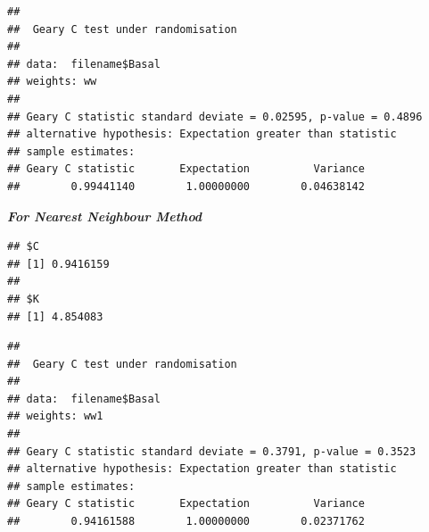 \documentclass[
]{book}
\newenvironment{Shaded}{\begin{snugshade}}{\end{snugshade}}
\newcommand{\AttributeTok}[1]{\textcolor[rgb]{0.77,0.63,0.00}{#1}}
\newcommand{\DecValTok}[1]{\textcolor[rgb]{0.00,0.00,0.81}{#1}}
\newcommand{\DocumentationTok}[1]{\textcolor[rgb]{0.56,0.35,0.01}{\textbf{\textit{#1}}}}
\newcommand{\FunctionTok}[1]{\textcolor[rgb]{0.00,0.00,0.00}{#1}}
\newcommand{\NormalTok}[1]{#1}
\newcommand{\SpecialCharTok}[1]{\textcolor[rgb]{0.00,0.00,0.00}{#1}}
\begin{document}
\begin{Shaded}
\end{Shaded}

\begin{verbatim}
## 
##  Geary C test under randomisation
## 
## data:  filename$Basal 
## weights: ww 
## 
## Geary C statistic standard deviate = 0.02595, p-value = 0.4896
## alternative hypothesis: Expectation greater than statistic
## sample estimates:
## Geary C statistic       Expectation          Variance 
##        0.99441140        1.00000000        0.04638142
\end{verbatim}

\textbf{\emph{For Nearest Neighbour Method}}

\begin{Shaded}
\end{Shaded}

\begin{verbatim}
## $C
## [1] 0.9416159
## 
## $K
## [1] 4.854083
\end{verbatim}

\begin{Shaded}
\end{Shaded}

\begin{verbatim}
## 
##  Geary C test under randomisation
## 
## data:  filename$Basal 
## weights: ww1 
## 
## Geary C statistic standard deviate = 0.3791, p-value = 0.3523
## alternative hypothesis: Expectation greater than statistic
## sample estimates:
## Geary C statistic       Expectation          Variance 
##        0.94161588        1.00000000        0.02371762
\end{verbatim}
\end{document}
